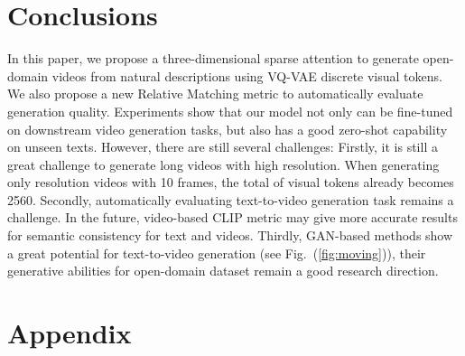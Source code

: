 \documentclass{article}
\begin{document}
\section{Conclusions}
In this paper, we propose a three-dimensional sparse attention to generate open-domain videos from natural descriptions using VQ-VAE discrete visual tokens. We also propose a new Relative Matching metric to automatically evaluate generation quality. Experiments show that our model not only can be fine-tuned on downstream video generation tasks, but also has a good zero-shot capability on unseen texts. However, there are still several challenges:
Firstly, it is still a great challenge to generate long videos with high resolution. When generating only  resolution videos with 10 frames, the total of visual tokens  already becomes 2560. Secondly, automatically evaluating text-to-video generation task remains a challenge. In the future, video-based CLIP metric may give more accurate results for semantic consistency for text and videos. Thirdly, GAN-based methods show a great potential for text-to-video generation (see Fig.~(\ref{fig:moving})), their generative abilities for open-domain dataset remain a good research direction.



\section{Appendix}

\newcommand{\awidth}{13cm}
\end{document}
